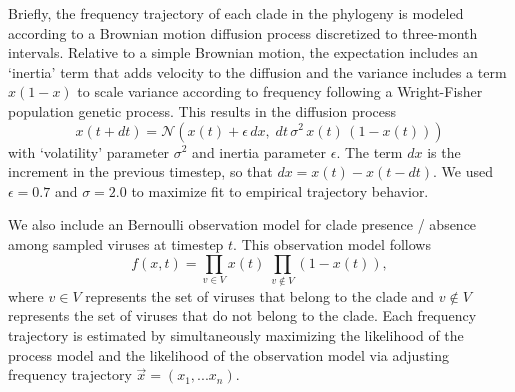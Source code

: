 \documentclass[11pt,oneside,letterpaper]{article}
\begin{document}
Briefly, the frequency trajectory of each clade in the phylogeny is modeled according to a Brownian motion diffusion process discretized to three-month intervals.
Relative to a simple Brownian motion, the expectation includes an `inertia' term that adds velocity to the diffusion and the variance includes a term $x(1-x)$ to scale variance according to frequency following a Wright-Fisher population genetic process.
This results in the diffusion process
\begin{equation}
  \label{eq_estimate_frequency}
x(t+dt) = \mathcal{N}\left(x(t) + \epsilon \, dx, \; dt \, \sigma^2 \, x(t) \, (1-x(t))\right)
\end{equation}
with `volatility' parameter $\sigma^2$ and inertia parameter $\epsilon$.
The term $dx$ is the increment in the previous timestep, so that $dx = x(t) - x(t-dt)$.
We used $\epsilon = 0.7$ and $\sigma = 2.0$ to maximize fit to empirical trajectory behavior.

We also include an Bernoulli observation model for clade presence / absence among sampled viruses at timestep $t$.
This observation model follows
\begin{equation}
f(x,t) = \prod_{v \in V} x(t) \; \prod_{v \notin V} (1-x(t)),
\end{equation}
where $v \in V$ represents the set of viruses that belong to the clade and $v \notin V$ represents the set of viruses that do not belong to the clade.
Each frequency trajectory is estimated by simultaneously maximizing the likelihood of the process model and the likelihood of the observation model via adjusting frequency trajectory $\vec{x} = (x_1, ... x_n)$.
\end{document}
